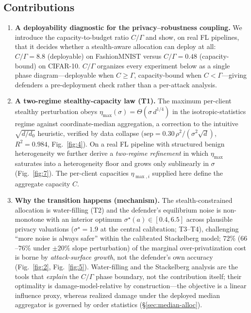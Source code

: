 \documentclass[final,1p,times]{elsarticle}
\begin{document}
\subsection{Contributions}
\begin{enumerate}
  \item[\textbf{C1}] \textbf{A deployability diagnostic for the
  privacy--robustness coupling.} We introduce the capacity-to-budget
  ratio $C/\Gamma$ and show, on real FL pipelines, that it decides
  whether a stealth-aware allocation can deploy at all: $C/\Gamma{=}8.8$
  (deployable) on FashionMNIST versus $C/\Gamma{=}0.48$ (capacity-bound)
  on CIFAR-10. $C/\Gamma$ organizes every experiment below as a single
  phase diagram---deployable when $C\ge\Gamma$, capacity-bound when
  $C<\Gamma$---giving defenders a pre-deployment check rather than a
  per-attack analysis.
  \item[\textbf{C2}] \textbf{A two-regime stealthy-capacity law (T1).}
  The maximum per-client stealthy perturbation obeys
  $\eta_{\max}(\sigma)=\Theta(\sigma\, d^{1/4})$ in the
  isotropic-statistics regime against coordinate-median aggregation, a
  correction to the intuitive $\sqrt{d/d_0}$ heuristic, verified by
  data collapse ($\mathrm{sep}=0.30\,\rho^2/(\sigma^2\sqrt{d})$,
  $R^2=0.984$, Fig.~\ref{fig:4}). On a real FL pipeline with structured benign
  heterogeneity we further derive a \emph{two-regime refinement} in which
  $\eta_{\max}$ saturates into a heterogeneity floor and grows only
  sublinearly in $\sigma$ (Fig.~\ref{fig:7}). The per-client capacities
  $\eta_{\max,i}$ supplied here define the aggregate capacity $C$.
  \item[\textbf{C3}] \textbf{Why the transition happens (mechanism).}
  The stealth-constrained allocation is water-filling (T2) and the
  defender's equilibrium noise is non-monotone with an interior optimum
  $\sigma^\star(a)\in[0.4,6.5]$ across plausible privacy valuations
  ($\sigma^\star{=}1.9$ at the central calibration; T3--T4), challenging
  ``more noise is always
  safer'' within the calibrated Stackelberg model; $72\%$
  ($66$--$76\%$ under $\pm20\%$ slope perturbation) of the marginal over-privatization cost is borne by
  \emph{attack-surface growth}, not the defender's own accuracy
  (Fig.~\ref{fig:2}, Fig.~\ref{fig:5}). Water-filling and the Stackelberg
  analysis are the tools that \emph{explain} the $C/\Gamma$ phase
  boundary, not the contribution itself; their optimality is
  damage-model-relative by construction---the objective is a linear
  influence proxy, whereas realized damage under the deployed median
  aggregator is governed by order statistics (\S\ref{sec:median-alloc}).
\end{enumerate}
\end{document}
